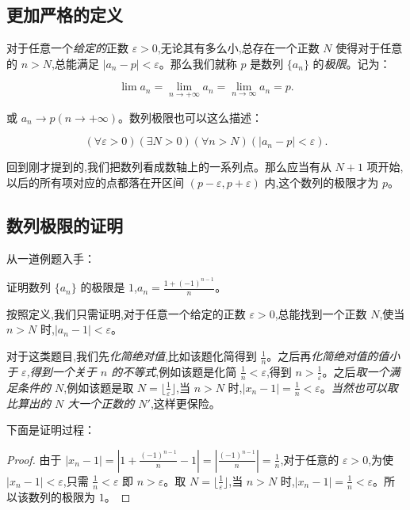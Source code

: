 \documentclass[lang=cn,10pt,twoside]{elegantbook}
\begin{document}
\subsection{更加严格的定义}
\begin{definition}
  对于任意一个\emph{给定的}正数 $\varepsilon > 0$,无论其有多么小,总存在一个正数 $N$ 使得对于任意的 $n > N$,总能满足 $|a_n - p| < \varepsilon$。那么我们就称 $p$ 是数列 $\{a_n\}$ 的\emph{极限}。记为：

  \begin{equation*}
    \lim a_n = \lim_{n \rightarrow +\infty} a_n = \lim_{n \rightarrow \infty} a_n = p .
  \end{equation*}

  或 $a_n \rightarrow p(n \rightarrow + \infty) $。数列极限也可以这么描述：

  \begin{equation*}
    (\forall \varepsilon > 0)(\exists N > 0)(\forall n > N)(|a_n - p| < \varepsilon) .
  \end{equation*}
\end{definition}

回到刚才提到的,我们把数列看成数轴上的一系列点。那么应当有从 $N+1$ 项开始,以后的所有项对应的点都落在开区间 $(p-\varepsilon, p+\varepsilon)$ 内,这个数列的极限才为 $p$。

\subsection{数列极限的证明}
从一道例题入手：

\begin{problem}
  证明数列 $\{a_n\}$ 的极限是 $1$,$a_n = \frac{1+(-1)^{n-1}}{n}$。
\end{problem}

按照定义,我们只需证明,对于任意一个给定的正数 $\varepsilon > 0$,总能找到一个正数 $N$,使当 $n > N$ 时,$|a_n - 1| < \varepsilon$。

对于这类题目,我们先\emph{化简绝对值},比如该题化简得到 $\frac{1}n$。之后再\emph{化简绝对值的值小于 $\varepsilon$,得到一个关于 $n$ 的不等式},例如该题是化简 $\frac 1n < \varepsilon$,得到 $n > \frac{1}{\varepsilon}$。之后\emph{取一个满足条件的 $N$},例如该题是取 $N = \lfloor\frac{1}{\varepsilon}\rfloor$,当 $n > N$ 时,$|x_n - 1| = \frac{1}{n} < \varepsilon$。\emph{当然也可以取比算出的 $N$ 大一个正数的 $N'$},这样更保险。

下面是证明过程：
\begin{proof}
  由于 $|x_n - 1| = |1+\frac{(-1)^{n-1}}{n} - 1| = |\frac{(-1)^{n-1}}{n}| = \frac 1n$,对于任意的 $\varepsilon > 0$,为使 $|x_n - 1| < \varepsilon$,只需 $\frac{1}{n} < \varepsilon$ 即 $n > \varepsilon$。取 $N = \lfloor\frac{1}{\varepsilon}\rfloor$,当 $n > N$ 时,$|x_n - 1| = \frac 1n < \varepsilon$。所以该数列的极限为 $1$。
\end{proof}
\end{document}
